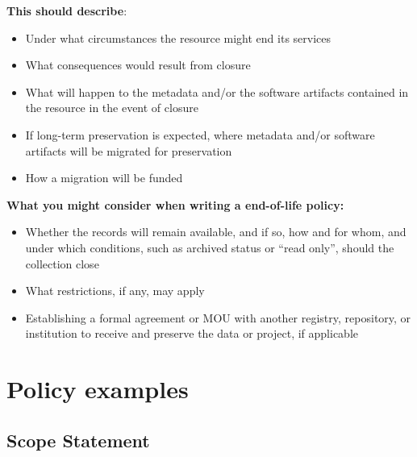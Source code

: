 \documentclass[11pt]{article}
\begin{document}
\textbf{This should describe}:

\begin{itemize}
\item Under what circumstances the resource might end its services

\item What consequences would result from closure

\item What will happen to the metadata and/or the software artifacts contained in the resource in the event of closure

\item If long-term preservation is expected, where metadata and/or software artifacts will be migrated for preservation

\item How a migration will be funded

\end{itemize}

\textbf{What you might consider when writing a end-of-life policy:}

\begin{itemize}
\item Whether the records will remain available, and if so, how and for whom, and under which conditions, such as archived status or ``read only'', should the collection close

\item What restrictions, if any, may apply

\item Establishing a formal agreement or MOU with another registry, repository, or institution to receive and preserve the data or project, if applicable

\end{itemize}


\section{Policy examples}
\label{policy-examples}

\vspace*{-3pt}
\subsection{Scope Statement}
\label{scope-statement}
\end{document}

